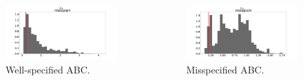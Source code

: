 \documentclass{beamer}
\begin{document}
\begin{frame}
    \begin{columns}
        \begin{column}{0.45\textwidth}
            \begin{figure}
                \centering
                \includegraphics[width=\columnwidth]{images/ar_abc_g1}
                \caption{Well-specified ABC.}
            \end{figure}
        \end{column}
        \begin{column}{0.45\textwidth}
            \begin{figure}
                \centering
                \includegraphics[width=\columnwidth]{images/ar_abc_c1}
                \caption{Misspecified ABC.}
            \end{figure}
        \end{column}
    \end{columns}
    \end{frame}
\end{document}
